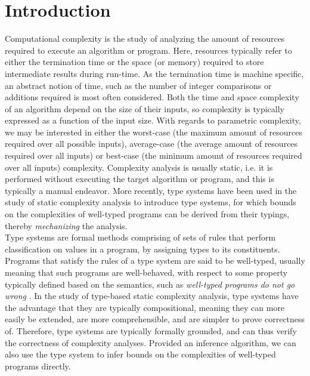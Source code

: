 \chapter{Introduction}
Computational complexity is the study of analyzing the amount of resources required to execute an algorithm or program. Here, resources typically refer to either the termination time or the space (or memory) required to store intermediate results during run-time. As the termination time is machine specific, an abstract notion of time, such as the number of integer comparisons or additions required is most often considered. Both the time and space complexity of an algorithm depend on the size of their inputs, so complexity is typically expressed as a function of the input size. With regards to parametric complexity, we may be interested in either the worst-case (the maximum amount of resources required over all possible inputs), average-case (the average amount of resources required over all inputs) or best-case (the minimum amount of resources required over all inputs) complexity. Complexity analysis is usually static, i.e. it is performed without executing the target algorithm or program, and this is typically a manual endeavor. More recently, type systems have been used in the study of static complexity analysis to introduce type systems, for which bounds on the complexities of well-typed programs can be derived from their typings, thereby \textit{mechanizing} the analysis.\\
%

Type systems are formal methods comprising of sets of rules that perform classification on values in a program, by assigning types to its constituents. Programs that satisfy the rules of a type system are said to be well-typed, usually meaning that such programs are well-behaved, with respect to some property typically defined based on the semantics, such as \textit{well-typed programs do not go wrong} \cite{Milner1978}. In the study of type-based static complexity analysis, type systems have the advantage that they are typically compositional, meaning they can more easily be extended, are more comprehensible, and are simpler to prove correctness of. Therefore, type systems are typically formally grounded, and can thus verify the correctness of complexity analyses. Provided an inference algorithm, we can also use the type system to infer bounds on the complexities of well-typed programs directly.\\

